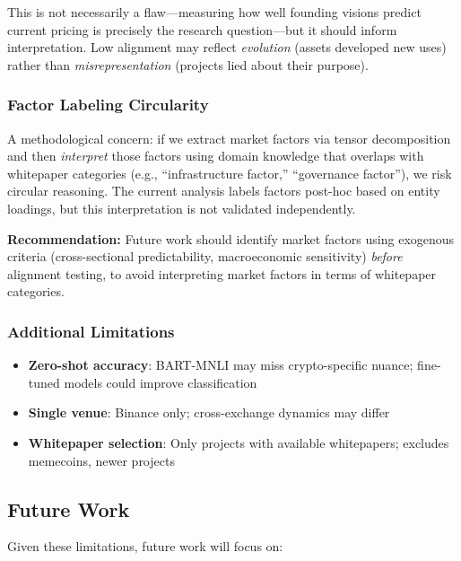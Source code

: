 \documentclass[11pt,twocolumn]{article}
\begin{document}
This is not necessarily a flaw---measuring how well founding visions predict current pricing is precisely the research question---but it should inform interpretation. Low alignment may reflect \textit{evolution} (assets developed new uses) rather than \textit{misrepresentation} (projects lied about their purpose).

\subsubsection{Factor Labeling Circularity}

A methodological concern: if we extract market factors via tensor decomposition and then \textit{interpret} those factors using domain knowledge that overlaps with whitepaper categories (e.g., ``infrastructure factor,'' ``governance factor''), we risk circular reasoning. The current analysis labels factors post-hoc based on entity loadings, but this interpretation is not validated independently.

\textbf{Recommendation:} Future work should identify market factors using exogenous criteria (cross-sectional predictability, macroeconomic sensitivity) \textit{before} alignment testing, to avoid interpreting market factors in terms of whitepaper categories.

\subsubsection{Additional Limitations}

\begin{itemize}[leftmargin=*]
    \item \textbf{Zero-shot accuracy}: BART-MNLI may miss crypto-specific nuance; fine-tuned models could improve classification
    \item \textbf{Single venue}: Binance only; cross-exchange dynamics may differ
    \item \textbf{Whitepaper selection}: Only projects with available whitepapers; excludes memecoins, newer projects
\end{itemize}

\subsection{Future Work}

Given these limitations, future work will focus on:
\end{document}
